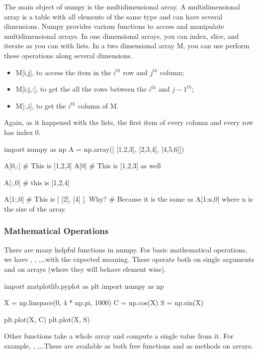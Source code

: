 The main object of numpy is the multidimensional array. A multidimensional array is a table with all elements of the same type and can have several dimensions. Numpy provides various functions to access and manipulate multidimensional arrays. In one dimensional arrays, you can index, slice, and iterate as you can with lists. In a two dimensional array M, you can use perform these operations along several dimensions.

\begin{itemize}
 \item M[i,j], to access the item in the $i^{th}$ row and $j^{th}$ column; 
 \item M[i:j,:], to get the all the rows between the $i^{th}$ and $j-1^{th}$;
 \item M[:,i], to get the $i^{th}$ column of M.
\end{itemize}

Again, as it happened with the lists, the first item of every column and every row has index 0.

\begin{python}
import numpy as np
A = np.array([
    [1,2,3],
    [2,3,4],
    [4,5,6]])

A[0,:] # This is [1,2,3]
A[0] # This is [1,2,3] as well

A[:,0] # this is [1,2,4]

A[1:,0] # This is [ [2], [4] ]. Why?
        # Because it is the same as A[1:n,0] where n is the size of the array.
\end{python}

\subsubsection{Mathematical Operations}

There are many helpful functions in numpy. For basic mathematical operations, we have , , ,\ldots with the expected meaning. These operate both on single arguments and on arrays (where they will behave element wise).

\begin{python}
import matplotlib.pyplot as plt
import numpy as np

X = np.linspace(0, 4 * np.pi, 1000)
C = np.cos(X)
S = np.sin(X)

plt.plot(X, C)
plt.plot(X, S)
\end{python}

Other functions take a whole array and compute a single value from it. For example, , ,\ldots These are available as both free functions and as methods on arrays.

